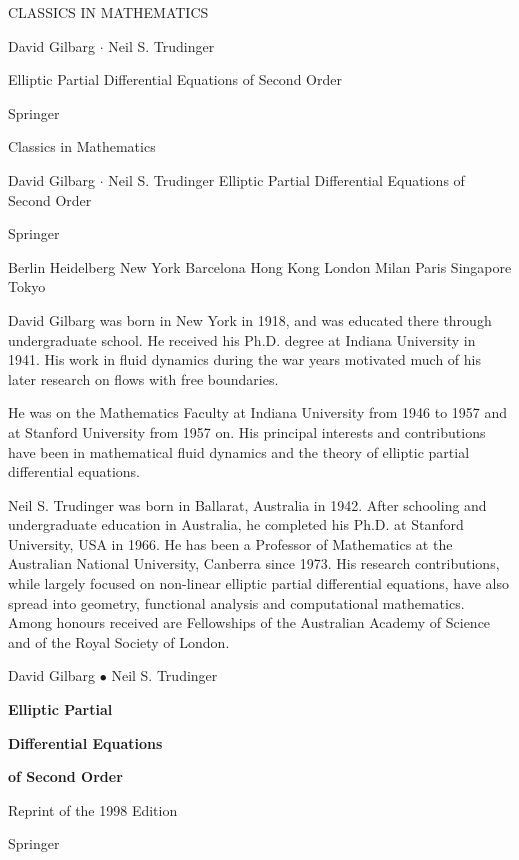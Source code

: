 

CLASSICS IN MATHEMATICS

David Gilbarg \(\cdot\) Neil S. Trudinger

Elliptic
Partial Differential
Equations
of Second Order

Springer

Classics in Mathematics

David Gilbarg $\cdot$ Neil S. Trudinger \hfill Elliptic Partial Differential Equations
of Second Order


Springer

Berlin
Heidelberg
New York
Barcelona
Hong Kong
London
Milan
Paris
Singapore
Tokyo


David Gilbarg was born in New York in 1918, and was educated there through undergraduate school. He received his Ph.D. degree at Indiana University in 1941. His work in fluid dynamics during the war years motivated much of his later research on flows with free boundaries.

He was on the Mathematics Faculty at Indiana University from 1946 to 1957 and at Stanford University from 1957 on. His principal interests and contributions have been in mathematical fluid dynamics and the theory of elliptic partial differential equations.

Neil S. Trudinger was born in Ballarat, Australia in 1942. After schooling and undergraduate education in Australia, he completed his Ph.D. at Stanford University, USA in 1966. He has been a Professor of Mathematics at the Australian National University, Canberra since 1973. His research contributions, while largely focused on non-linear elliptic partial differential equations, have also spread into geometry, functional analysis and computational mathematics. Among honours received are Fellowships of the Australian Academy of Science and of the Royal Society of London.

\begin{center}
David Gilbarg \(\bullet\) Neil S. Trudinger

\vspace{2.5em}

\Large\textbf{Elliptic Partial}

\Large\textbf{Differential Equations}

\Large\textbf{of Second Order}

\vspace{2.5em}

Reprint of the 1998 Edition

\vfill

Springer
\end{center}

